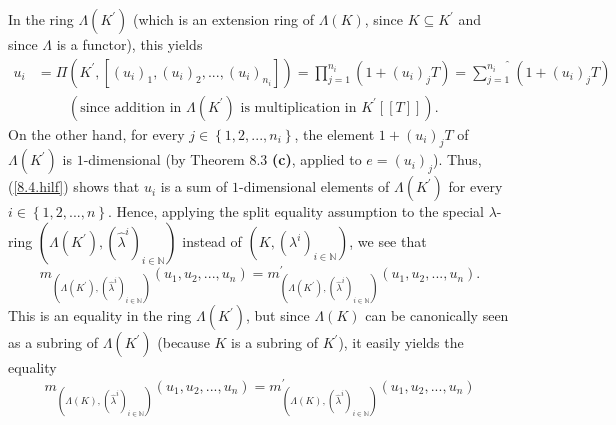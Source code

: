 \documentclass[numbers=enddot,12pt,final,onecolumn,notitlepage]{scrartcl}%
\begin{document}
In the ring $\Lambda\left(  K^{\prime}\right)  $ (which is an extension ring
of $\Lambda\left(  K\right)  $, since $K\subseteq K^{\prime}$ and since
$\Lambda$ is a functor), this yields%
\begin{align}
u_{i}  &  =\Pi\left(  K^{\prime},\left[  \left(  u_{i}\right)  _{1},\left(
u_{i}\right)  _{2},...,\left(  u_{i}\right)  _{n_{i}}\right]  \right)
=\prod_{j=1}^{n_{i}}\left(  1+\left(  u_{i}\right)  _{j}T\right)
=\widehat{\sum_{j=1}^{n_{i}}}\left(  1+\left(  u_{i}\right)  _{j}T\right)
\nonumber\\
&  \ \ \ \ \ \ \ \ \ \ \left(  \text{since addition in }\Lambda\left(
K^{\prime}\right)  \text{ is multiplication in }K^{\prime}\left[  \left[
T\right]  \right]  \right)  . \label{8.4.hilf}%
\end{align}
On the other hand, for every $j\in\left\{  1,2,...,n_{i}\right\}  $, the
element $1+\left(  u_{i}\right)  _{j}T$ of $\Lambda\left(  K^{\prime}\right)
$ is $1$-dimensional (by Theorem 8.3 \textbf{(c)}, applied to $e=\left(
u_{i}\right)  _{j}$). Thus, (\ref{8.4.hilf}) shows that $u_{i}$ is a sum of
$1$-dimensional elements of $\Lambda\left(  K^{\prime}\right)  $ for every
$i\in\left\{  1,2,...,n\right\}  $. Hence, applying the split equality
assumption to the special $\lambda$-ring $\left(  \Lambda\left(  K^{\prime
}\right)  ,\left(  \widehat{\lambda}^{i}\right)  _{i\in\mathbb{N}}\right)  $
instead of $\left(  K,\left(  \lambda^{i}\right)  _{i\in\mathbb{N}}\right)  $,
we see that%
\begin{equation}
m_{\left(  \Lambda\left(  K^{\prime}\right)  ,\left(  \widehat{\lambda}%
^{i}\right)  _{i\in\mathbb{N}}\right)  }\left(  u_{1},u_{2},...,u_{n}\right)
=m_{\left(  \Lambda\left(  K^{\prime}\right)  ,\left(  \widehat{\lambda}%
^{i}\right)  _{i\in\mathbb{N}}\right)  }^{\prime}\left(  u_{1},u_{2}%
,...,u_{n}\right)  . \label{8.4.fast}%
\end{equation}
This is an equality in the ring $\Lambda\left(  K^{\prime}\right)  $, but
since $\Lambda\left(  K\right)  $ can be canonically seen as a subring of
$\Lambda\left(  K^{\prime}\right)  $ (because $K$ is a subring of $K^{\prime}%
$), it easily yields the equality%
\[
m_{\left(  \Lambda\left(  K\right)  ,\left(  \widehat{\lambda}^{i}\right)
_{i\in\mathbb{N}}\right)  }\left(  u_{1},u_{2},...,u_{n}\right)  =m_{\left(
\Lambda\left(  K\right)  ,\left(  \widehat{\lambda}^{i}\right)  _{i\in
\mathbb{N}}\right)  }^{\prime}\left(  u_{1},u_{2},...,u_{n}\right)
\]
\end{document}
